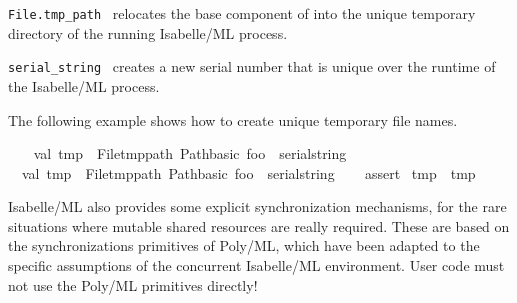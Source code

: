 \begin{isabellebody}
\begin{isamarkuptext}
  \begin{description}

  \item \verb|File.tmp_path|~ relocates the base
  component of  into the unique temporary directory of
  the running Isabelle/ML process.

  \item \verb|serial_string|~\isa{{\isacharparenleft}{\isacharparenright}} creates a new serial number
  that is unique over the runtime of the Isabelle/ML process.

  \end{description}%
\end{isamarkuptext}%
\isamarkuptrue%
%
\endisatagmlref
{\isafoldmlref}%
%
\isadelimmlref
%
\endisadelimmlref
%
\isadelimmlex
%
\endisadelimmlex
%
\isatagmlex
%
\begin{isamarkuptext}%
The following example shows how to create unique
  temporary file names.%
\end{isamarkuptext}%
\isamarkuptrue%
%
\endisatagmlex
{\isafoldmlex}%
%
\isadelimmlex
%
\endisadelimmlex
%
\isadelimML
%
\endisadelimML
%
\isatagML
{}\isamarkupfalse%
\ {\isacharverbatimopen}\isanewline
\ \ val\ tmp{}\ {\isacharequal}\ File{\isachardot}tmp{\isacharunderscore}path\ {\isacharparenleft}Path{\isachardot}basic\ {\isacharparenleft}{\isachardoublequote}foo{\isachardoublequote}\ {\isacharcircum}\ serial{\isacharunderscore}string\ {\isacharparenleft}{\isacharparenright}{\isacharparenright}{\isacharparenright}{\isacharsemicolon}\isanewline
\ \ val\ tmp{}\ {\isacharequal}\ File{\isachardot}tmp{\isacharunderscore}path\ {\isacharparenleft}Path{\isachardot}basic\ {\isacharparenleft}{\isachardoublequote}foo{\isachardoublequote}\ {\isacharcircum}\ serial{\isacharunderscore}string\ {\isacharparenleft}{\isacharparenright}{\isacharparenright}{\isacharparenright}{\isacharsemicolon}\isanewline
\ \ %
\isaantiq
assert%
\endisaantiq
\ {\isacharparenleft}tmp{}\ {\isacharless}{\isachargreater}\ tmp{}{\isacharparenright}{\isacharsemicolon}\isanewline
{\isacharverbatimclose}%
\endisatagML
{\isafoldML}%
%
\isadelimML
%
\endisadelimML
%
\isamarkuptrue%
%
\begin{isamarkuptext}%
Isabelle/ML also provides some explicit synchronization
  mechanisms, for the rare situations where mutable shared resources
  are really required.  These are based on the synchronizations
  primitives of Poly/ML, which have been adapted to the specific
  assumptions of the concurrent Isabelle/ML environment.  User code
  must not use the Poly/ML primitives directly!


\end{isamarkuptext}
\end{isabellebody}
